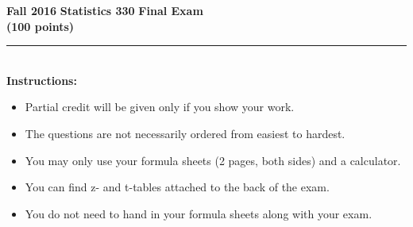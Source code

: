 \documentclass[12pt]{article}
\begin{document}
\begin{center}
  \textbf{\large Fall 2016} \hfill \textbf{\large Statistics 330} \hfill \textbf{\large Final Exam}\\
  \hfill \textbf{(100 points)}
\end{center}
\vspace*{1in}
 \rule{5in}{.01in}\\[1in]
\textbf{Instructions:}\\
\begin{itemize}
\item {\large Partial credit will be given only if you show your work.}
\item {\large The questions are not necessarily ordered from easiest to hardest.}
\item {\large You may only use your formula sheets (2 pages, both sides) and a calculator.}
\item {\large You can find z- and t-tables attached to the back of the exam.}
\item {\large You do not need to hand in your formula sheets along with your exam.}
\end{itemize}
\end{document}
